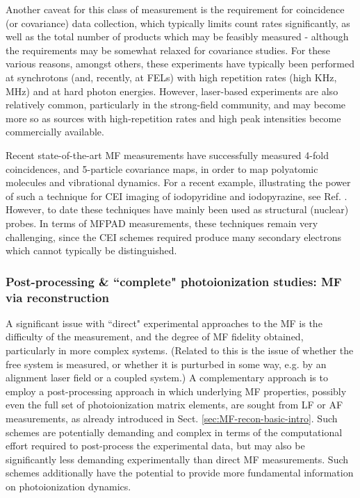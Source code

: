 \documentclass[10pt]{article}
\begin{document}
Another caveat for this class of measurement is the requirement for coincidence (or covariance) data collection, which typically limits count rates significantly, as well as the total number of products which may be feasibly measured - although the requirements may be somewhat relaxed for covariance studies. For these various reasons, amongst others, these experiments have typically been performed at synchrotons (and, recently, at FELs) with high repetition rates (high KHz, MHz) and at hard photon energies. However, laser-based experiments are also relatively common, particularly in the strong-field community, and may become more so as sources with high-repetition rates and high peak intensities become commercially available. 

Recent state-of-the-art MF measurements have successfully measured 4-fold coincidences, and 5-particle covariance maps, in order to map polyatomic molecules and vibrational dynamics. %
For a recent example, illustrating the power of such a technique for CEI imaging of iodopyridine and iodopyrazine, see Ref.   \cite{boll2022XrayMultiphotoninducedCoulomb}. However, to date these techniques have mainly been used as structural (nuclear) probes. In terms of MFPAD measurements, these techniques remain very challenging, since the CEI schemes required produce many secondary electrons which cannot typically be distinguished. 



\subsubsection{Post-processing \& ``complete" photoionization studies: MF via reconstruction\label{sec:MF-recon-expt}}


A significant issue with ``direct" experimental approaches to the MF is the difficulty of the measurement, and the degree of MF fidelity obtained, particularly in more complex systems. (Related to this is the issue of whether the free system is measured, or whether it is purturbed in some way, e.g. by an alignment laser field or a coupled system.) A complementary approach is to employ a post-processing approach in which underlying MF properties, possibly even the full set of photoionization matrix elements, are sought from LF or AF measurements, as already introduced in Sect. \ref{sec:MF-recon-basic-intro}. Such schemes are potentially demanding and complex in terms of the computational effort required to post-process the experimental data, but may also be significantly less demanding experimentally than direct MF measurements. Such schemes additionally have the potential to provide more fundamental information on photoionization dynamics.
\end{document}
